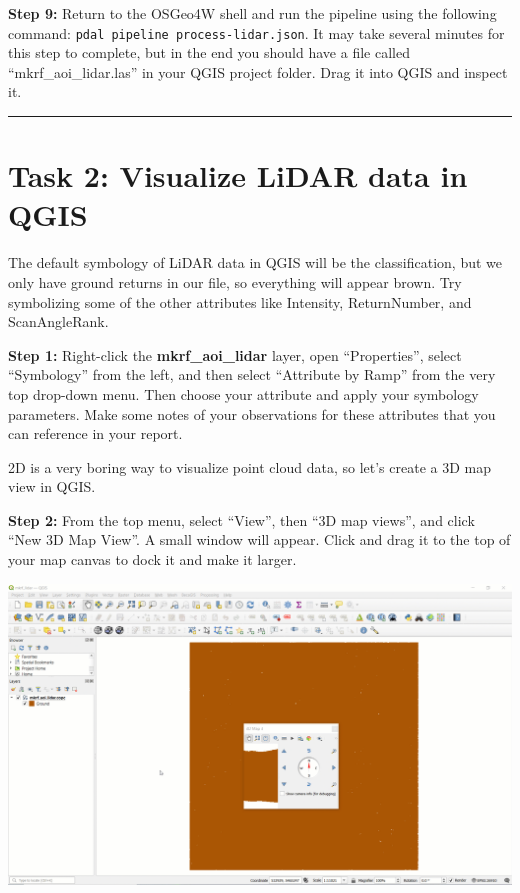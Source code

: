 \documentclass[
]{book}
\begin{document}
\textbf{Step 9:} Return to the OSGeo4W shell and run the pipeline using the following command: \texttt{pdal\ pipeline\ process-lidar.json}. It may take several minutes for this step to complete, but in the end you should have a file called ``mkrf\_aoi\_lidar.las'' in your QGIS project folder. Drag it into QGIS and inspect it.

\begin{center}\rule{0.5\linewidth}{0.5pt}\end{center}

\hypertarget{task-2-visualize-lidar-data-in-qgis}{%
\section*{Task 2: Visualize LiDAR data in QGIS}\label{task-2-visualize-lidar-data-in-qgis}}

The default symbology of LiDAR data in QGIS will be the classification, but we only have ground returns in our file, so everything will appear brown. Try symbolizing some of the other attributes like Intensity, ReturnNumber, and ScanAngleRank.

\textbf{Step 1:} Right-click the \textbf{mkrf\_aoi\_lidar} layer, open ``Properties'', select ``Symbology'' from the left, and then select ``Attribute by Ramp'' from the very top drop-down menu. Then choose your attribute and apply your symbology parameters. Make some notes of your observations for these attributes that you can reference in your report.

2D is a very boring way to visualize point cloud data, so let's create a 3D map view in QGIS.

\textbf{Step 2:} From the top menu, select ``View'', then ``3D map views'', and click ``New 3D Map View''. A small window will appear. Click and drag it to the top of your map canvas to dock it and make it larger.

\includegraphics[width=1\linewidth]{images/01-qgis-dock-3d-map-view}
\end{document}
